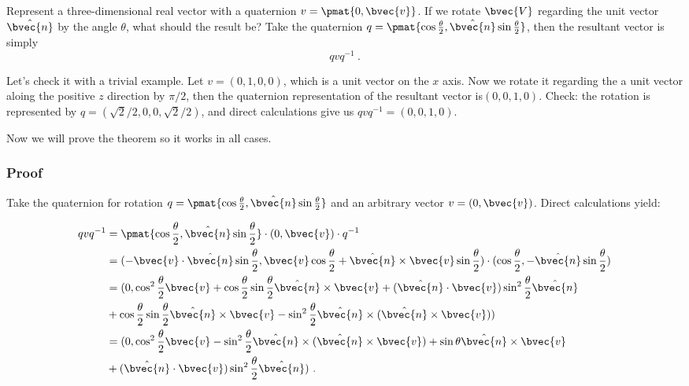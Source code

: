 Represent a three-dimensional real vector with a quaternion $v=\pmat{0, \bvec{v}}$. If we rotate $\bvec{V}$ regarding the unit vector $\hat{\bvec{n}}$ by the angle $\theta$, what should the result be? Take the quaternion $q=\pmat{\cos{\frac{\theta}{2}}, \hat{\bvec{n}}\sin{\frac{\theta}{2}}}$, then the resultant vector is simply
\begin{equation}
qvq^{-1}~.
\end{equation}

Let's check it with a trivial example. Let $v=(0, 1, 0, 0)$, which is a unit vector on the $x$ axis. Now we rotate it regarding the a unit vector aloing the positive $z$ direction by $\pi/2$, then the quaternion representation of the resultant vector is$(0, 0, 1, 0)$. Check: the rotation is represented by $q=(\sqrt{2}/2, 0, 0, \sqrt{2}/2)$, and direct calculations give us $qvq^{-1}=(0,0,1,0)$. 

Now we will prove the theorem so it works in all cases. 

\subsubsection{Proof}

Take the quaternion for rotation $q=\pmat{\cos{\frac{\theta}{2}}, \hat{\bvec{n}}\sin{\frac{\theta}{2}}}$ and an arbitrary vector $v=(0, \bvec{v})$. Direct calculations yield: 

\begin{equation}\label{eq_QuaRot_2}
\begin{aligned}
qvq^{-1}&=\pmat{\cos{\frac{\theta}{2}}, \hat{\bvec{n}}\sin{\frac{\theta}{2}}}\cdot (0, \bvec{v})\cdot q^{-1}\\&
=(-\bvec{v}\cdot\hat{\bvec{n}}\sin{\frac{\theta}{2}}, \bvec{v}\cos{\frac{\theta}{2}}+\hat{\bvec{n}}\times\bvec{v}\sin{\frac{\theta}{2}})\cdot (\cos{\frac{\theta}{2}}, -\hat{\bvec{n}}\sin{\frac{\theta}{2}})\\&
=(0, \cos^2\frac{\theta}{2}\bvec{v}+\cos\frac{\theta}{2}\sin\frac{\theta}{2}\hat{\bvec{n}}\times\bvec{v}+(\hat{\bvec{n}}\cdot\bvec{v})\sin^2\frac{\theta}{2}\hat{\bvec{n}}\\&+\cos\frac{\theta}{2}\sin\frac{\theta}{2}\hat{\bvec{n}}\times\bvec{v}-\sin^2\frac{\theta}{2}\hat{\bvec{n}}\times(\hat{\bvec{n}}\times\bvec{v}))\\&
=(0, \cos^2\frac{\theta}{2}\bvec{v}-\sin^2\frac{\theta}{2}\hat{\bvec{n}}\times(\hat{\bvec{n}}\times\bvec{v})+\sin\theta\hat{\bvec{n}}\times\bvec{v}\\&+(\hat{\bvec{n}}\cdot\bvec{v})\sin^2\frac{\theta}{2}\hat{\bvec{n}})~.
\end{aligned}
\end{equation}

